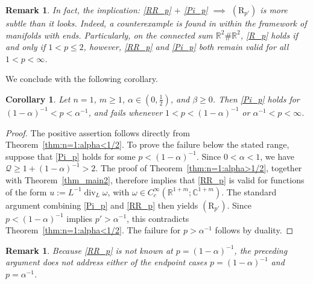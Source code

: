 \documentclass[12pt]{amsart}
\newtheorem{corollary}[theorem]{Corollary}
\newtheorem{remark}[theorem]{Remark}
\begin{document}
\begin{remark}
In fact, the implication: \eqref{RR_p} $+$ \eqref{Pi_p} $\implies$ $(\mathrm{R}_{p'})$ is more subtle than it looks. Indeed, a counterexample is found in \cite[Theorem~1.5]{HeSi} within the framework of manifolds with ends. Particularly, on the connected sum $\mathbb{R}^2 \# \mathbb{ R}^2$, \eqref{R_p} holds if and only if $1<p\le 2$, however, \eqref{RR_p} and \eqref{Pi_p} both remain valid for all $1<p<\infty$.
\end{remark}



We conclude with the following corollary.

\begin{corollary}
Let $n=1$, $m\geq1$, $\alpha\in(0,\frac12)$, and $\beta\geq0$. Then
\eqref{Pi_p} holds for $(1-\alpha)^{-1}<p<\alpha^{-1}$, and fails whenever $1<p<(1-\alpha)^{-1}$ or $\alpha^{-1}<p<\infty$.
\end{corollary}

\begin{proof}
The positive assertion follows directly from
Theorem~\ref{thm:n=1:alpha<1/2}. To prove the failure below the stated
range, suppose that \eqref{Pi_p} holds for some
$p<(1-\alpha)^{-1}$. Since $0<\alpha<1$, we have $\mathcal Q\geq 1+(1-\alpha)^{-1}>2$. The proof of Theorem~\ref{thm:n=1:alpha>1/2}, together with Theorem~\ref{thm_main2}, therefore implies that \eqref{RR_p} is valid for functions of the form $u:=L^{-1}\operatorname{div}_L\omega$, with $\omega\in C_c^\infty(\mathbb{R}^{1+m};\mathbb{C}^{1+m})$. The standard argument combining \eqref{Pi_p} and \eqref{RR_p} then yields $(\mathrm{R}_{p'})$. Since $p<(1-\alpha)^{-1}$ implies $p'>\alpha^{-1}$, this contradicts Theorem~\ref{thm:n=1:alpha<1/2}. The failure for $p>\alpha^{-1}$ follows by duality.
\end{proof}

\begin{remark}
Because \eqref{RR_p} is not known at $p=(1-\alpha)^{-1}$, the preceding
argument does not address either of the endpoint cases $p=(1-\alpha)^{-1}$ and $p=\alpha^{-1}$.
\end{remark}















\end{document}
